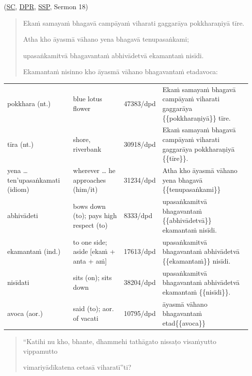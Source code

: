 \documentclass[11pt,oneside]{memoir}
\begin{document}
(\href{https://suttacentral.net/an10.81/pli/ms}{SC}, \href{https://www.digitalpalireader.online/\_dprhtml/index.html?loc=a.9.0.0.1.3.0.m}{DPR}, \href{http://localhost:4848/suttas/an10.81/pli/ms?window\_type=Sutta+Study}{SSP}, Sermon 18)

\begin{quote}
Ekaṁ samayaṁ bhagavā campāyaṁ viharati gaggarāya pokkharaṇiyā tīre.

Atha kho āyasmā vāhano yena bhagavā tenupasaṅkami;

upasaṅkamitvā bhagavantaṁ abhivādetvā ekamantaṁ nisīdi.

Ekamantaṁ nisinno kho āyasmā vāhano bhagavantaṁ etadavoca:
\end{quote}

\begin{longtable}{L{\colOne} L{\colTwo} H H}
pokkhara (nt.) & blue lotus flower & 47383/dpd & Ekaṁ samayaṁ bhagavā campāyaṁ viharati gaggarāya \{\{pokkharaṇiyā\}\} tīre.\\[0pt]
tīra (nt.) & shore, riverbank & 30918/dpd & Ekaṁ samayaṁ bhagavā campāyaṁ viharati gaggarāya pokkharaṇiyā \{\{tīre\}\}.\\[0pt]
yena \ldots{} ten'upasaṅkamati (idiom) & wherever \ldots{} he approaches (him/it) & 31234/dpd & Atha kho āyasmā vāhano yena bhagavā \{\{tenupasaṅkami\}\}\\[0pt]
abhivādeti & bows down (to); pays high respect (to) & 8333/dpd & upasaṅkamitvā bhagavantaṁ \{\{abhivādetvā\}\} ekamantaṁ nisīdi.\\[0pt]
ekamantaṁ (ind.) & to one side; aside [ekaṁ + anta + aṁ] & 17613/dpd & upasaṅkamitvā bhagavantaṁ abhivādetvā \{\{ekamantaṁ\}\} nisīdi.\\[0pt]
nisīdati & sits (on); sits down & 38204/dpd & upasaṅkamitvā bhagavantaṁ abhivādetvā ekamantaṁ \{\{nisīdi\}\}.\\[0pt]
avoca (aor.) & said (to); aor. of vacati & 10795/dpd & āyasmā vāhano bhagavantaṁ etad\{\{avoca\}\}\\[0pt]
\end{longtable}

\begin{quote}
“Katihi nu kho, bhante, dhammehi tathāgato nissaṭo visaṁyutto vippamutto

vimariyādīkatena cetasā viharatī”ti?
\end{quote}
\end{document}
